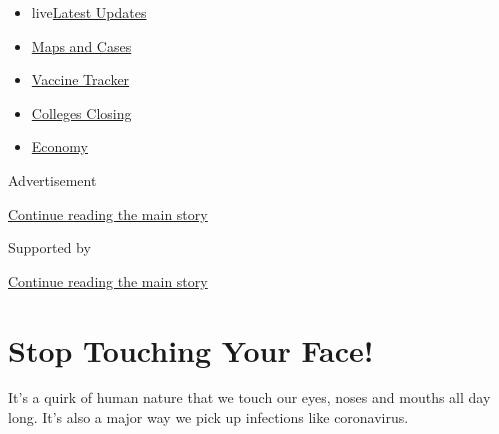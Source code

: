 \begin{itemize}
\tightlist
\item
  live\href{https://www.nytimes3xbfgragh.onion/2020/08/21/world/covid-19-coronavirus.html?name=styln-coronavirus-national\&region=TOP_BANNER\&variant=undefined\&block=storyline_menu_recirc\&action=click\&pgtype=Article\&impression_id=34b5c700-e392-11ea-b455-d1693a15a47a}{Latest
  Updates}
\item
  \href{https://www.nytimes3xbfgragh.onion/interactive/2020/us/coronavirus-us-cases.html?name=styln-coronavirus-national\&region=TOP_BANNER\&variant=undefined\&block=storyline_menu_recirc\&action=click\&pgtype=Article\&impression_id=34b5c701-e392-11ea-b455-d1693a15a47a}{Maps
  and Cases}
\item
  \href{https://www.nytimes3xbfgragh.onion/interactive/2020/science/coronavirus-vaccine-tracker.html?name=styln-coronavirus-national\&region=TOP_BANNER\&variant=undefined\&block=storyline_menu_recirc\&action=click\&pgtype=Article\&impression_id=34b5c702-e392-11ea-b455-d1693a15a47a}{Vaccine
  Tracker}
\item
  \href{https://www.nytimes3xbfgragh.onion/2020/08/19/us/colleges-closing-covid.html?name=styln-coronavirus-national\&region=TOP_BANNER\&variant=undefined\&block=storyline_menu_recirc\&action=click\&pgtype=Article\&impression_id=34b5c703-e392-11ea-b455-d1693a15a47a}{Colleges
  Closing}
\item
  \href{https://www.nytimes3xbfgragh.onion/live/2020/08/20/business/stock-market-today-coronavirus?name=styln-coronavirus-national\&region=TOP_BANNER\&variant=undefined\&block=storyline_menu_recirc\&action=click\&pgtype=Article\&impression_id=34b5c704-e392-11ea-b455-d1693a15a47a}{Economy}
\end{itemize}

Advertisement

\protect\hyperlink{after-top}{Continue reading the main story}

Supported by

\protect\hyperlink{after-sponsor}{Continue reading the main story}

\hypertarget{stop-touching-your-face}{%
\section{Stop Touching Your Face!}\label{stop-touching-your-face}}

It's a quirk of human nature that we touch our eyes, noses and mouths
all day long. It's also a major way we pick up infections like
coronavirus.

